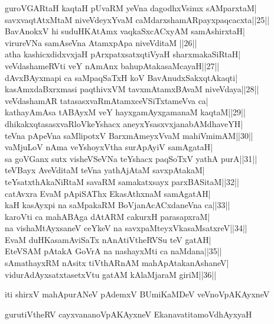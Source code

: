 \documentclass{article}
\begin{document}
guroVGARtaH kaqtaH pUvaRM yeVna dagodhxVsimx sAMparxtaM|\\
savxvaqtAtxMtaM niveVdeyxYvaM caMdarxshamARpayxpaqcacxta||25||\\
BavAnokxV hi suduHKAtAmx vaqkaSxcACxyAM  samAshirxtaH|\\
virureVNa samAseVna AtamxpApa niveVditaM ||26||\\
atha kashicxdidxvxjaH pArxpatxsatxqtiVyaH sharxmakaSiRtaH|\\
veVdashameRVti veY nAmAnx bahupAtakasaMcayaH||27||\\
dAvxBAyxmapi ca saMpaqSaTxH koV BavAnudxSakxqtAkaqti|\\
kasAmxdaBxrxmasi paqthivxVM tavxmAtamxBAvaM niveVdaya||28||\\
veVdashamAR tatasasxvaRmAtamxceVSiTxtameVva ca|\\
kathayAmAsa tABAyxM veY hayxgamAyxgamanaM kaqtaM||29||\\
dhikakxqtasasxvaRloVkeYshacx aneyxYsasxvxjanabAMdhaveYH|\\
teVna pApeVna saMlipotxV BarxmAmeyxVvaM mahiVmimAM||30||\\
vaMjuLoV nAma veYshoyxVtha surApAyiV samAgataH|\\
sa goVGanx sutx visheVSeVNa teYshacx paqSoTxV yathA purA||31||\\
teVBayx AveVditaM teVna yathAjAtaM savxpAtakaM|\\
teYsatxthAkaNiRtaM savaRM samakatxsayx parxBASitaM||32||\\
catAvxra EvaM pApiSAThx EkasAthxnaM samAgatAH|\\
kaH kasAyxpi na saMpakaRM BoVjanAcACxdaneVna ca||33||\\
karoVti ca mahABAga dAtARM cakurxH parasapxraM|\\
na vishaMtAyxsaneV ceYkeV na savxpaMteyxVkasaMsatxreV||34||\\
EvaM duHKasamAviSaTx nAnAtiVtheRVSu teV gatAH|\\
EteVSAM pAtakA GoVrA na nashayxMti ca naMdana||35||\\
sAmathayxRM nAsitx tiVthARnAM mahApAtakanAshaneV|\\
vidurAdAyxsatxtasetxVtu gatAM kAlaMjaraM giriM||36||

\begin{center}
iti shirxV mahApurANeV pAdemxV BUmiKaMDeV veVnoVpAKAyxneV
\end{center}

\begin{center}
gurutiVtheRV cayxvananoVpAKAyxneV EkanavatitamoVdhAyxyaH
\end{center}
\end{document}
